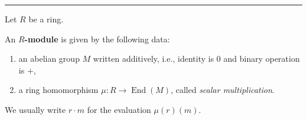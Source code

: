 \documentclass[12pt]{article}
\newcommand{\keyword}[1]{\textbf{#1}}
\newcommand{\sepline}{\rule{\textwidth}{0.4pt}}
\theoremstyle{definition}
\newcommand{\<}{\left\langle}
\renewcommand{\>}{\right\rangle}
\DeclareMathOperator{\End}{End}
\begin{document}
\sepline

Let $R$ be a ring.

An \keyword{$R$-module} is given by the following data:
\begin{enumerate}[(1)]
    \item an abelian group $M$ written additively, i.e., identity is $0$ and binary operation is $+$,
    \item a ring homomorphism $\mu : R \to \End(M)$, called \emph{scalar multiplication}.
\end{enumerate}
We usually write $r \cdot m$ for the evaluation $\mu(r)(m)$.
\end{document}
